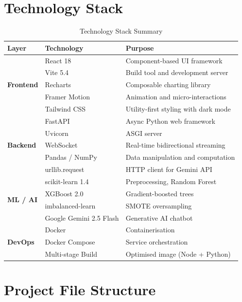 \documentclass[12pt, a4paper]{report}
\begin{document}
\section{Technology Stack}

\begin{table}[H]
\centering
\caption{Technology Stack Summary}
\label{tab:techstack}
\begin{tabularx}{\textwidth}{l l X}
\toprule
\textbf{Layer} & \textbf{Technology} & \textbf{Purpose} \\
\midrule
\multirow{5}{*}{\textbf{Frontend}} 
    & React 18 & Component-based UI framework \\
    & Vite 5.4 & Build tool and development server \\
    & Recharts & Composable charting library \\
    & Framer Motion & Animation and micro-interactions \\
    & Tailwind CSS & Utility-first styling with dark mode \\
\midrule
\multirow{5}{*}{\textbf{Backend}} 
    & FastAPI & Async Python web framework \\
    & Uvicorn & ASGI server \\
    & WebSocket & Real-time bidirectional streaming \\
    & Pandas / NumPy & Data manipulation and computation \\
    & urllib.request & HTTP client for Gemini API \\
\midrule
\multirow{4}{*}{\textbf{ML / AI}} 
    & scikit-learn 1.4 & Preprocessing, Random Forest \\
    & XGBoost 2.0 & Gradient-boosted trees \\
    & imbalanced-learn & SMOTE oversampling \\
    & Google Gemini 2.5 Flash & Generative AI chatbot \\
\midrule
\multirow{3}{*}{\textbf{DevOps}} 
    & Docker & Containerisation \\
    & Docker Compose & Service orchestration \\
    & Multi-stage Build & Optimised image (Node + Python) \\
\bottomrule
\end{tabularx}
\end{table}

\section{Project File Structure}
\end{document}
